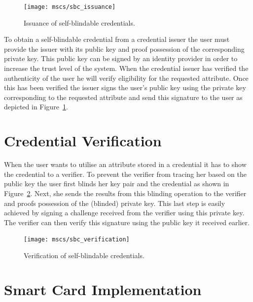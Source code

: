 \begin{figure}[ht]
  \centering
  \texttt{[image: mscs/sbc\_issuance]}
  \caption{Issuance of self-blindable credentials.}
  \label{fig:SBC-issuance}
\end{figure}

To obtain a self-blindable credential from a credential issuer the user must
provide the issuer with its public key and proof possession of the corresponding
private key. This public key can be signed by an identity provider in order to
increase the trust level of the system. When the credential issuer has verified
the authenticity of the user he will verify eligibility for the requested
attribute. Once this has been verified the issuer signs the user's public key
using the private key corresponding to the requested attribute and send this
signature to the user as depicted in Figure~\ref{fig:SBC-issuance}.

\section{Credential Verification}

When the user wants to utilise an attribute stored in a credential it has to
show the credential to a verifier. To prevent the verifier from tracing her
based on the public key the user first blinds her key pair and the credential as
shown in Figure~\ref{fig:SBC-verification}. Next, she sends the results from
this blinding operation to the verifier and proofs possession of the (blinded)
private key. This last step is easily achieved by signing a challenge received
from the verifier using this private key. The verifier can then verify this
signature using the public key it received earlier.

\begin{figure}[ht]
  \centering
  \texttt{[image: mscs/sbc\_verification]}
  \caption{Verification of self-blindable credentials.}
  \label{fig:SBC-verification}
\end{figure}

\section{Smart Card Implementation}


